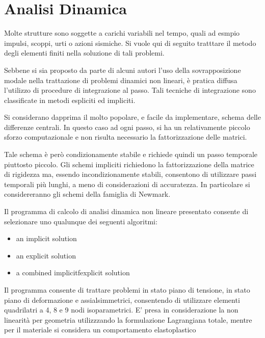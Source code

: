 \chapter{Analisi Dinamica}

Molte strutture sono soggette a carichi variabili nel tempo, quali ad esmpio impulsi, scoppi, 
urti o azioni sismiche. Si vuole qui di seguito tratttare il metodo degli elementi finiti 
nella soluzione di tali problemi.

Sebbene si sia proposto da parte di alcuni autori l'uso della sovrapposizione modale nella trattazione
di problemi dinamici non lineari, è pratica diffusa l'utilizzo di procedure di integrazione al passo. 
Tali tecniche di integrazione sono classificate in metodi espliciti ed impliciti.

Si considerano dapprima il molto popolare, e facile da implementare, schema delle differenze centrali.
In questo caso ad ogni passo, si ha un relativamente piccolo sforzo computazionale e non risulta 
necessario la fattorizzazione delle matrici.

Tale schema è però condizionamente stabile e richiede quindi un passo temporale piuttosto piccolo.
Gli schemi impliciti richiedono la fattorizzazione della matrice di rigidezza ma, essendo 
incondizionamente stabili, consentono di utilizzare passi temporali più lunghi, a meno di 
considerazioni di accuratezza. In particolare si considereranno gli schemi della famiglia di Newmark.

Il programma di calcolo di analisi dinamica non lineare presentato consente di selezionare 
uno qualunque dei seguenti algoritmi:
\begin{itemize}
	\item an implicit solution
	\item an explicit solution
	\item a combined implicitfexplicit solution
\end{itemize}

Il programma consente di trattare problemi in stato piano di tensione, in stato piano di deformazione
e assialsimmetrici, consentendo di utilizzare elementi quadrilatri a 4, 8 e 9 nodi isoparametrici. 
E' presa in considerazione la non linearità per geometria utilizzzando la formulazione Lagrangiana totale,
mentre per il materiale si considera un comportamento elastoplastico

